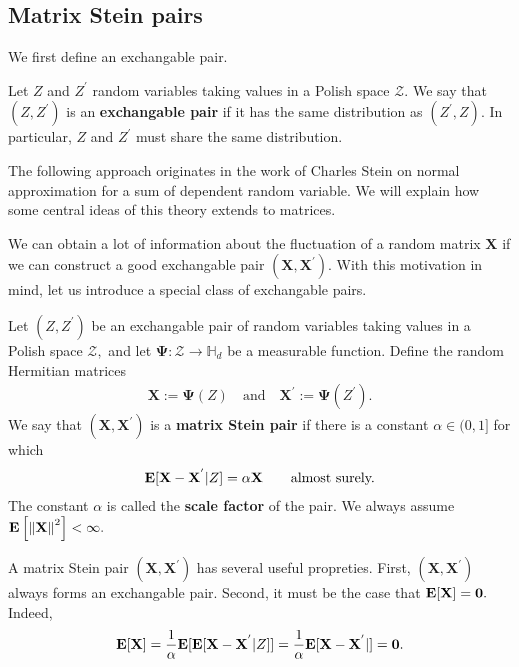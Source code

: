 \subsection{Matrix Stein pairs}
We first define an exchangable pair.
\begin{definition}
  Let 
  $Z$ and $Z^{'}$
  random variables taking values
  in a Polish space $\mathcal{Z}.$
  We say that
  $
  (
    Z
    ,
    Z^{'}
  )
  $
  is an \textbf{exchangable pair}
  if it has the same distribution as 
  $
  (
  Z^{'}
    ,
    Z
  )
  .
  $
  In particular, 
  $Z$ and $Z^{'}$
  must share the same distribution.
\end{definition}

The following approach originates in the work of Charles Stein \cite{Stein1972} 
on normal approximation for a sum of dependent random variable.
We will explain how some central ideas of this theory extends to matrices.

We can obtain a lot of information about the fluctuation of a random matrix
$\mathbf{X}$
if we can construct a good exchangable pair 
$
(
  \mathbf{X}
  ,
  \mathbf{X}^{'}
)
.
$
With this motivation in mind, let us introduce a special class of exchangable pairs.
\begin{definition}
  Let
  $
  (
    Z
    ,
    Z^{'}
  )
  $
  be an exchangable pair of random variables taking values
  in a Polish space $\mathcal{Z},$
  and let 
  $
    \mathbf{\Psi}
    : 
    \mathcal{Z}
    \to 
  \mathbb{H}_d
  $
  be a measurable function.
  Define the random Hermitian matrices
  \begin{gather}
    \mathbf{X}
    :=
    \mathbf{\Psi}
    (Z)
    \quad
    \text{and}
    \quad
    \mathbf{X}^{'}
    :=
    \mathbf{\Psi}
    (Z^{'})
    .
  \end{gather}
  We say that 
  $
  (
    \mathbf{X}
    ,
    \mathbf{X}^{'}
  )
  $
  is a \textbf{matrix Stein pair}
  if there is a constant 
  $\alpha\in (0,1]$
  for which
  \begin{gather}
    \mathbf{E}[
    \mathbf{X}
    -
    \mathbf{X}^{'}
    \vert
    Z
    ]
    =
    \alpha 
    \mathbf{X}
    \qquad
    \text{almost surely.}
  \end{gather}
  The constant 
  $\alpha$
  is called the \textbf{scale factor} of the pair.
  We always assume 
  $
    \mathbf{E}
    \left[ 
      \left\lVert\mathbf{X}\right\rVert^2
    \right]
    <
    \infty
    .
  $
\end{definition}

A matrix Stein pair 
$
(
\mathbf{X}
,
\mathbf{X}^{'}
)
$
has several useful propreties. First,
$
(
\mathbf{X}
,
\mathbf{X}^{'}
)
$
always forms an exchangable pair. Second, it must be the case that
$\mathbf{E}[\mathbf{X}]=\mathbf{0}.$
Indeed,
\begin{gather*}
  \mathbf{E}[\mathbf{X}]
  =
  \frac{1}{\alpha}
  \mathbf{E}[
  \mathbf{E}
  [
    \mathbf{X}
    -
    \mathbf{X}^{'}
    \vert
    Z
  ]
  ]
  =
  \frac{1}{\alpha}
  \mathbf{E}[
    \mathbf{X}
    -
    \mathbf{X}^{'}
    \vert
  ]
  =
  \mathbf{0}
  .
\end{gather*}
